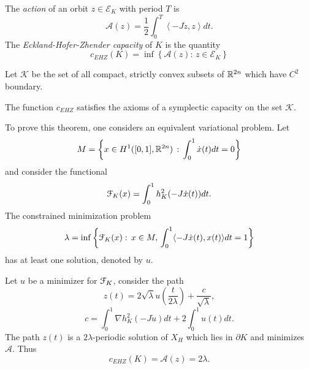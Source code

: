 \documentclass[../capacities_main.tex]{subfiles}
\begin{document}
	\begin{Definition}
		The \emph{action} of an orbit $z \in \mathcal{E}_K$ with period $T$ is
		\begin{equation*}
		\mathcal{A}(z) = \frac{1}{2}\int_{0}^T \left<-J\dot z,z\right> dt.
		\end{equation*}
		The \emph{Eckland-Hofer-Zhender capacity} of $K$ is the quantity
		\begin{equation*}
		c_{EHZ}(K) = \inf\left\{\mathcal{A}(z): \, z\in \mathcal{E}_K\right\}
		\end{equation*}
	\end{Definition}
	Let $\mathcal{K}$ be the set of all compact, strictly convex subsets of ${\mathbb R}^{2n}$ which have $C^2$ boundary.
	\begin{Theorem}
		The function $c_{EHZ}$ satisfies the axioms of a symplectic capacity on the set $\mathcal{K}$.
	\end{Theorem}
	
	To prove this theorem, one considers an equivalent variational problem. Let 
	\begin{equation*}
	M = \left\{ x\in H^{1}([0,1],{\mathbb R}^{2n})\,:\, \int_0^1 \dot x(t)dt = 0\right\}
	\end{equation*}
	and consider the functional 
	\begin{equation*}
	{\mathcal F}_K(x) = \int_0^1h_K^2(-J\dot x(t))dt.
	\end{equation*}
	The constrained minimization problem 
	\begin{equation}\label{MinProblem}
	\lambda = \inf\left\{ {\mathcal F}_K(x) : \, x\in M,\, \int_0^1\langle -J\dot x(t),x(t)\rangle dt = 1\right\}
	\end{equation}
	has at least one solution, denoted by $u$. 
	
	\begin{Proposition}
		Let $u$ be a minimizer for ${\mathcal F}_K$, consider the path 
		\begin{equation}
		z(t) = 2\sqrt{\lambda} u\left(\frac{t}{2\lambda}\right) + \frac{c}{\sqrt{\lambda}},
		\end{equation}
		\begin{equation}
		c=\int_0^1 \nabla h_K^2(-J\dot u)dt + 2\int_0^1 u(t) dt.
		\end{equation}
		The path $z(t)$ is a $2\lambda$-periodic solution of $X_H$ which lies in $\partial K$ and minimizes $\mathcal{A}$. Thus
		\begin{equation*}
		c_{EHZ}(K)  = \mathcal{A}(z) = 2\lambda.
		\end{equation*}
	\end{Proposition}
	
\end{document}
